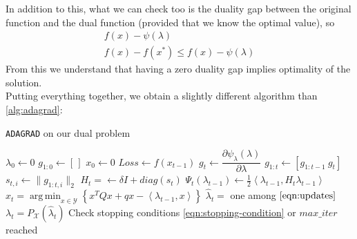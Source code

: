 \documentclass[notitlepage]{article}
\DeclareMathOperator*{\argmin}{arg\,min}
\begin{document}
In addition to this, what we can check too is the duality gap between the original function and the dual function (provided that we know the optimal value), so
\begin{gather*}
  f(x) - \psi(\lambda) \\
  f(x) - f(x^*) \le f(x) - \psi(\lambda)
\end{gather*}
From this we understand that having a zero duality gap implies optimality of the solution.\\ 
Putting everything together, we obtain a slightly different algorithm than \ref{alg:adagrad}:
\begin{flushleft}
  \begin{minipage}{.7\textwidth}
    \begin{algorithm}[H]
      \caption{\texttt{ADAGRAD} on our dual problem}
      \label{alg:my_alg}
      \begin{algorithmic}
          \State $\lambda_0 \gets 0$
          \State $g_{1:0} \gets \left[\,\right]$
          \State $x_0 \gets 0$
            \State $Loss \gets f(x_{t-1})$
            \State $g_t \gets \dfrac{\partial \psi_\lambda(\lambda)}{\partial \lambda}$
            \State $g_{1:t} \gets \left[ g_{1:t-1}\ g_t \right]$
            \State $s_{t,i} \gets \| g_{1:t,i} \|_2$
            \State $H_t = \gets \delta \mathit{I} + diag(s_t)$
            \State $\Psi_t(\lambda_{t-1}) \gets \frac{1}{2} \left\langle \lambda_{t-1},H_t \lambda_{t-1} \right\rangle$  
            \State $x_t = \argmin_{x \in \mathcal{Y}} \left\lbrace x^T Q x + q x - \left\langle \lambda_{t-1},x \right\rangle \right\rbrace$
            \State $\hat{\lambda}_t =$ one among $\eqref{eqn:updates}$
            \State $\lambda_t = P_\mathcal{X}(\hat{\lambda}_t)$ 
            \State Check stopping conditions \eqref{eqn:stopping-condition} or $max\_iter$ reached
          \EndFor
        \EndFunction
      \end{algorithmic}  
    \end{algorithm}
  \end{minipage}
\end{flushleft}
\end{document}
